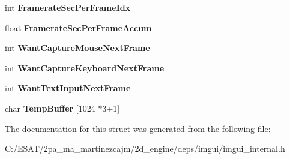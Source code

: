 \begin{DoxyCompactItemize}
int {\bfseries Framerate\+Sec\+Per\+Frame\+Idx}
\item 
\mbox{\label{struct_im_gui_context_abcd18f2f8fedf0f45c3148b3e956e653}} 
float {\bfseries Framerate\+Sec\+Per\+Frame\+Accum}
\item 
\mbox{\label{struct_im_gui_context_a7e7a9bbeaac9519abe29818ce6c2cc3b}} 
int {\bfseries Want\+Capture\+Mouse\+Next\+Frame}
\item 
\mbox{\label{struct_im_gui_context_a0372056c72eac8b3e6de06c404caa5b3}} 
int {\bfseries Want\+Capture\+Keyboard\+Next\+Frame}
\item 
\mbox{\label{struct_im_gui_context_abe551d35ea5c1aa61a4d5c785c8e0d9d}} 
int {\bfseries Want\+Text\+Input\+Next\+Frame}
\item 
\mbox{\label{struct_im_gui_context_a875033fc5c10bc1e050f8701055ae93b}} 
char {\bfseries Temp\+Buffer} \mbox{[}1024 $\ast$3+1\mbox{]}
\end{DoxyCompactItemize}


The documentation for this struct was generated from the following file\+:\begin{DoxyCompactItemize}
\item 
C\+:/\+E\+S\+A\+T/2pa\+\_\+ma\+\_\+martinezcajm/2d\+\_\+engine/deps/imgui/imgui\+\_\+internal.\+h\end{DoxyCompactItemize}
